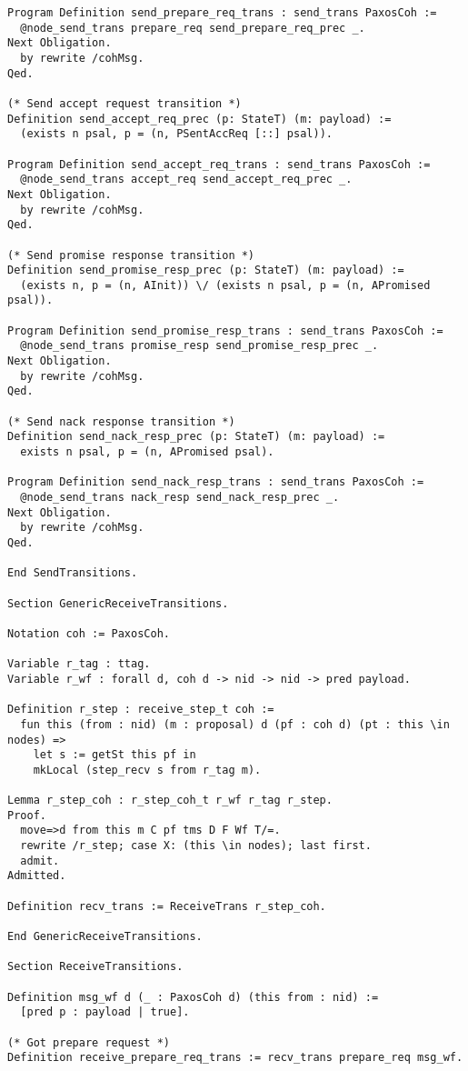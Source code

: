 \begin{landscape}
\begin{multicols*}{2}
\begin{lstlisting}[style=SourceCodeListing]
Program Definition send_prepare_req_trans : send_trans PaxosCoh :=
  @node_send_trans prepare_req send_prepare_req_prec _.
Next Obligation.
  by rewrite /cohMsg.
Qed.

(* Send accept request transition *)
Definition send_accept_req_prec (p: StateT) (m: payload) :=
  (exists n psal, p = (n, PSentAccReq [::] psal)).

Program Definition send_accept_req_trans : send_trans PaxosCoh :=
  @node_send_trans accept_req send_accept_req_prec _.
Next Obligation.
  by rewrite /cohMsg.
Qed.

(* Send promise response transition *)
Definition send_promise_resp_prec (p: StateT) (m: payload) :=
  (exists n, p = (n, AInit)) \/ (exists n psal, p = (n, APromised psal)).

Program Definition send_promise_resp_trans : send_trans PaxosCoh :=
  @node_send_trans promise_resp send_promise_resp_prec _.
Next Obligation.
  by rewrite /cohMsg.
Qed.

(* Send nack response transition *)
Definition send_nack_resp_prec (p: StateT) (m: payload) :=
  exists n psal, p = (n, APromised psal).

Program Definition send_nack_resp_trans : send_trans PaxosCoh :=
  @node_send_trans nack_resp send_nack_resp_prec _.
Next Obligation.
  by rewrite /cohMsg.
Qed.

End SendTransitions.

Section GenericReceiveTransitions.

Notation coh := PaxosCoh.

Variable r_tag : ttag.
Variable r_wf : forall d, coh d -> nid -> nid -> pred payload.

Definition r_step : receive_step_t coh :=
  fun this (from : nid) (m : proposal) d (pf : coh d) (pt : this \in nodes) =>
    let s := getSt this pf in
    mkLocal (step_recv s from r_tag m).

Lemma r_step_coh : r_step_coh_t r_wf r_tag r_step.
Proof.
  move=>d from this m C pf tms D F Wf T/=.
  rewrite /r_step; case X: (this \in nodes); last first.
  admit.
Admitted.

Definition recv_trans := ReceiveTrans r_step_coh.

End GenericReceiveTransitions.

Section ReceiveTransitions.

Definition msg_wf d (_ : PaxosCoh d) (this from : nid) :=
  [pred p : payload | true].

(* Got prepare request *)
Definition receive_prepare_req_trans := recv_trans prepare_req msg_wf.


\end{lstlisting}
\end{multicols*}
\end{landscape}
